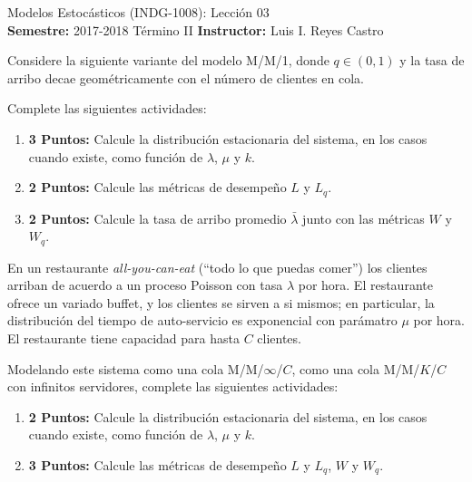 \documentclass[ a4paper, twoside, 11pt]{article}
\newcommand{\numero}{03}
\begin{document}
\allowdisplaybreaks



\begin{center}
\Large Modelos Estoc\'asticos (INDG-1008): Lecci\'on \numero \\[2ex]
\small \textbf{Semestre:} 2017-2018 T\'ermino II \qquad
\textbf{Instructor:} Luis I. Reyes Castro
\end{center}
\fullskip

\begin{problem}
\label{prob:arribo-geometrico-prima}
Considere la siguiente variante del modelo M/M/1, donde $q \in (0,1)$ y la tasa de arribo decae geom\'etricamente con el n\'umero de clientes en cola. 

\begin{figure}[htb]
\centering
\def\svgwidth{0.9\columnwidth}

\end{figure}
\halfskip

Complete las siguientes actividades: 
\begin{enumerate}[label=\textbf{\alph*)}]
\item \textbf{3 Puntos:} Calcule la distribuci\'on estacionaria del sistema, en los casos cuando existe, como funci\'on de $\lambda$, $\mu$ y $k$. 
\item \textbf{2 Puntos:} Calcule las m\'etricas de desempe\~no $L$ y $L_q$. 
\item \textbf{2 Puntos:} Calcule la tasa de arribo promedio $\bar{\lambda}$ junto con las m\'etricas $W$ y $W_q$. 
\end{enumerate}

\end{problem}
\fullskip

\begin{problem}
\label{prob:m_m_infinito}
En un restaurante \emph{all-you-can-eat} (\ie ``todo lo que puedas comer'') los clientes arriban de acuerdo a un proceso Poisson con tasa $\lambda$ por hora. El restaurante ofrece un variado buffet, y los clientes se sirven a si mismos; en particular, la distribuci\'on del tiempo de auto-servicio es exponencial con par\'amatro $\mu$ por hora. El restaurante tiene capacidad para hasta $C$ clientes. 

Modelando este sistema como una cola M/M/$\infty$/$C$, \ie como una cola M/M/$K$/$C$ con infinitos servidores, complete las siguientes actividades: 
\begin{enumerate}[label=\textbf{\alph*)}]
\item \textbf{2 Puntos:} Calcule la distribuci\'on estacionaria del sistema, en los casos cuando existe, como funci\'on de $\lambda$, $\mu$ y $k$. 
\item \textbf{3 Puntos:} Calcule las m\'etricas de desempe\~no $L$ y $L_q$, $W$ y $W_q$. 
\end{enumerate}

\end{problem}
\fullskip
\end{document}
